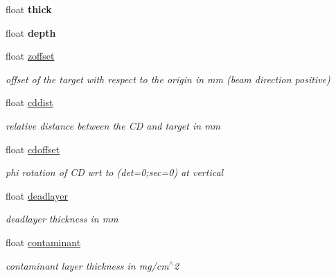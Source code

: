 \begin{DoxyCompactItemize}
float {\bfseries thick}
\item 
\mbox{\label{classg__clx_a55b2ad47323975fbefd70314a1580d26}} 
float {\bfseries depth}
\item 
\mbox{\label{classg__clx_a85780ae170aef9d5362a47520ee3a822}} 
float \hyperlink{classg__clx_a85780ae170aef9d5362a47520ee3a822}{zoffset}
\begin{DoxyCompactList}\small\item\em offset of the target with respect to the origin in mm (beam direction positive) \end{DoxyCompactList}\item 
\mbox{\label{classg__clx_af6483d6ed4f21d91fe1ac7e88393ab4e}} 
float \hyperlink{classg__clx_af6483d6ed4f21d91fe1ac7e88393ab4e}{cddist}
\begin{DoxyCompactList}\small\item\em relative distance between the CD and target in mm \end{DoxyCompactList}\item 
\mbox{\label{classg__clx_a2f16d48f2601cfd6ccb100283f3cdab7}} 
float \hyperlink{classg__clx_a2f16d48f2601cfd6ccb100283f3cdab7}{cdoffset}
\begin{DoxyCompactList}\small\item\em phi rotation of CD wrt to (det=0;sec=0) at vertical \end{DoxyCompactList}\item 
\mbox{\label{classg__clx_a9868b722188e951233b134083dd63370}} 
float \hyperlink{classg__clx_a9868b722188e951233b134083dd63370}{deadlayer}
\begin{DoxyCompactList}\small\item\em deadlayer thickness in mm \end{DoxyCompactList}\item 
\mbox{\label{classg__clx_a9093a10412ab047b3b910e4c4a9d70d1}} 
float \hyperlink{classg__clx_a9093a10412ab047b3b910e4c4a9d70d1}{contaminant}
\begin{DoxyCompactList}\small\item\em contaminant layer thickness in mg/cm$^\wedge$2 \end{DoxyCompactList}\item 

\end{DoxyCompactItemize}
